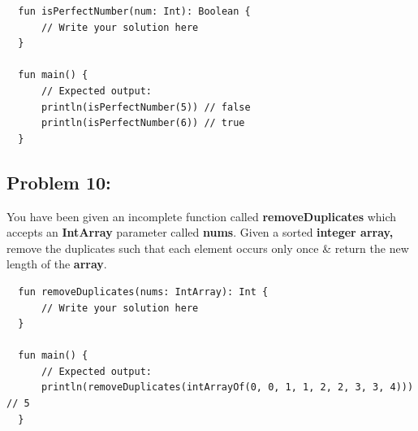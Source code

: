 \documentclass{article}
\begin{document}
\begin{verbatim}
  fun isPerfectNumber(num: Int): Boolean {
      // Write your solution here
  }

  fun main() {
      // Expected output:
      println(isPerfectNumber(5)) // false
      println(isPerfectNumber(6)) // true
  }
\end{verbatim}

\subsection*{Problem 10:}
You have been given an incomplete function called \textbf{removeDuplicates} which accepts an \textbf{IntArray} parameter called \textbf{nums}. Given a sorted \textbf{integer array,} remove the duplicates such that each element occurs only once \& return the new length of the \textbf{array}.

\begin{verbatim}
  fun removeDuplicates(nums: IntArray): Int {
      // Write your solution here  
  }

  fun main() {
      // Expected output:
      println(removeDuplicates(intArrayOf(0, 0, 1, 1, 2, 2, 3, 3, 4))) // 5
  }
\end{verbatim}
\end{document}
